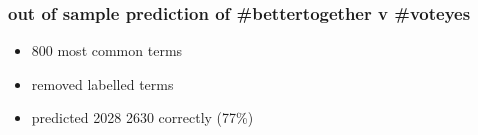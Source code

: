 \documentclass[11pt, table, dvipsnames]{beamer}
\begin{document}

\begin{frame}
\frametitle{out of sample prediction of \#bettertogether v \#voteyes}
  \begin{itemize}
  \item 800 most common terms
  \item removed labelled terms
  \item predicted 2028 \/ 2630 correctly (77\%)
  \end{itemize}
\end{frame}
\end{document}
